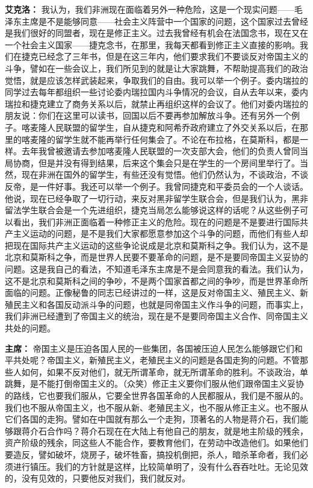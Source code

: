 \begin{duihua}
\item[\textbf{艾克洛：}] 我认为，我们非洲现在面临着另外一种危险，这是一个现实问题——毛泽东主席是不是能够同意——社会主义阵营中一个国家的问题，这个国家过去曾经是我们很好的同盟者，现在是修正主义。过去我曾经有机会在法国念书，现在又在一个社会主义国家——捷克念书，在那里，我每天都看到修正主义直接的影响。我们在捷克已经念了三年书，但是在这三年内，他们要求我们不要谈反对帝国主义的斗争，譬如在一些会议上，我们所见到的就是让大家跳舞，不帮助提高我们的政治觉悟，就是应该怎样武装起来，争取我们的自由。我可以举一个例子。委内瑞拉的同学过去每年都组织一些讨论委内瑞拉国内斗争情况的会议，自从去年以来，委内瑞拉和捷克建立了商务关系以后，就禁止再组织这样的会议了。他们对委内瑞拉的朋友说：你们在这里可以读书，回国以后不要再参加解放斗争。还有另外一个例子。喀麦隆人民联盟的留学生，自从捷克和阿希乔政府建立了外交关系以后，在那里的喀麦隆的留学生就不能再举行任何集会了。不论在布拉格，在莫斯科，都是一样。去年我曾被邀请去参加喀麦隆人民联盟的一次支部大会，他们的负责人曾同当局协商，但是并没有得到结果，后来这个集会只是在学生的一个房间里举行了。当然，现在非洲在国外的留学生，有些还没有觉悟。他们仍然认为，不谈政治，不谈反帝，是一件好事。我还可以举一个例子。我曾同捷克和平委员会的一个人谈话。他说，现在已经争取了一切行动，来反对黑非留学生联合会，但是我们认为，黑非留法学生联合会是一个先进组织，捷克当局怎么能够说这样的话呢？从这些例子可以看出，我们非洲正面临着一种修正主义的危险。现在的问题是不是要进行国际共产主义运动的问题，是不是我们大家都愿意参加这个斗争的问题，而他们有些人却把现在国际共产主义运动的这些争论说成是北京和莫斯科之争。我们认为，这不是北京和莫斯科之争，而是世界人民要不要革命的问题，是不是要同帝国主义妥协的问题。这是我自己的看法，不知道毛泽东主席是不是会同意我的看法。我们认为，这不是北京和莫斯科之间的争吵，不是两个国家首都之间的争吵，而是世界革命所面临的问题。正像秘鲁的同志已经讲过的一样，这是反对帝国主义、殖民主义、新殖民主义和各国反动派斗争的问题，也就是同帝国主义作斗争的问题，而事实上，我们非洲已经遭到了帝国主义的统治，现在是不是要同帝国主义合作、同帝国主义共处的问题。

\item[\textbf{主席：}] 帝国主义是压迫各国人民的一些集团，各国被压迫人民怎么能够跟它们和平共处呢？帝国主义，新殖民主义，老殖民主义的问题是各国走狗的问题。不管那些人如何，如果不反对他们，就无所谓革命，就无所谓革命的胜利。不谈政治，单跳舞，是不能打倒帝国主义的。（众笑）修正主义要你们服从他们跟帝国主义妥协的路线，它也要我们服从，它要全世界各国革命的人民都服从，我们是不服从的。我们也不服从帝国主义，也不服从新、老殖民主义，也不服从修正主义。也不服从它们各国的走狗。譬如在中国就有那么一个走狗，顶著名的人物是蒋介石，我们能够跟蒋介石合作吗？蒋介石现在在大陆上有他自己的朋友，就是地主阶级的残余，资产阶级的残余，同这些人不能合作，要教育他们，在劳动中改造他们。如果他们要造反，譬如破坏，烧房子，破坏牲畜，搞投机倒把，杀人，暗杀革命者，我们必须进行镇压。我们的方针就是这样，比较简单明了，没有什么吞吞吐吐。无论见效的，没有见效的，只要他反对我们，我们就反对。


\end{duihua}
